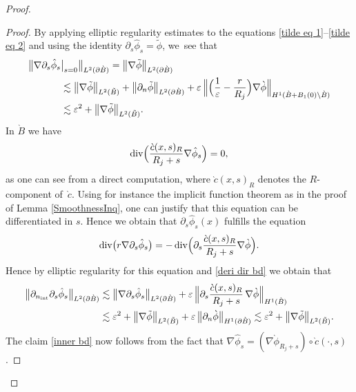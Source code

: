 \documentclass[JEP,XML,SOM,Unicode,published]{cedram}
\let\epsilon\varepsilon
\let\backslash\setminus
\theoremstyle{definition}
\renewcommand{\div}{\operatorname{div}}
\newcommand\bnorm[1]{\bigl\lVert #1\bigr\rVert}
\newcommand\Bnorm[1]{\Bigl\lVert #1\Bigr\rVert}
\newcommand\eq{=}
\let\de\partial
\let\eps\epsilon
\let\mel\relax
\begin{document}
\begin{proof}
\begin{proof}
By applying elliptic regularity estimates to the equations \eqref{tilde eq 1}--\eqref{tilde eq 2} and using the identity $\de_s\hat{\phi}_s=\tilde{\phi}$, we~see that
\begin{equation}\begin{aligned}
\bigl\|\nabla\de_s\hat{\phi}_s&\big|_{s=0}\bigr\|_{L^2(\de\grave{B})}\eq\bnorm{\nabla\tilde{\phi}}_{L^2(\de\grave{B})}\\
&\lesssim \bnorm{\nabla\tilde{\phi}}_{L^2(\tilde{B})}+\bnorm{\de_n\tilde{\phi}}_{L^2(\de\grave{B})}+\eps\,\Bnorm{\Bigl(\frac{1}{\eps}-\frac{r}{R_j}\Bigr)\nabla\grave{\phi}}_{H^1(\grave{B}+B_1(0)\backslash\grave{B})}\\
&\lesssim\eps^2+\bnorm{\nabla\tilde{\phi}}_{L^2(\tilde{B})}.\label{deri dir bd}
\end{aligned}\end{equation}
In $\grave{B}$ we have
\begin{align*}
\div\Bigl(\frac{\grave{c}(x,s)_R}{R_j+s}\nabla\hat{\phi}_s\Bigr)\eq0,
\end{align*}
as one can see from a direct computation, where $\grave{c}(x,s)_R$ denotes the $R$-component of~$\grave{c}$. Using for instance the implicit function theorem as in the proof of Lemma \ref{SmoothnessInq}, one can justify that this equation can be differentiated in $s$.
Hence we obtain that $\de_s\hat{\phi}_s(x)$ fulfills the equation
\begin{align*}
\div\bigl(r\nabla\de_s\hat{\phi}_s\bigr)\eq-\div\Bigl(\de_s\frac{\grave{c}(x,s)_R}{R_j+s}\nabla\grave{\phi}\Bigr).
\end{align*}
Hence by elliptic regularity for this equation and \eqref{deri dir bd} we obtain that
\begin{align*}
\mel\bnorm{\de_{n_\mathrm{int}}\de_s\hat{\phi}_s}_{L^2(\de\grave{B})}&\lesssim \bnorm{\nabla\de_s\hat{\phi}_s}_{L^2(\de\grave{B})}+\eps\,\Bnorm{\de_s\frac{\grave{c}(x,s)_R}{R_j+s}\,\nabla\grave{\phi}}_{H^1(\grave{B})}\\
&\lesssim \eps^2+\bnorm{\nabla\tilde{\phi}}_{L^2(\tilde{B})}+\eps\,\bnorm{\de_n\grave{\phi}}_{H^1(\de\grave{B})}\lesssim \eps^2+\bnorm{\nabla\tilde{\phi}}_{L^2(\tilde{B})}.
\end{align*}
The claim \eqref{inner bd} now follows from the fact that $\nabla\hat{\phi}_s=(\nabla\grave{\phi}_{R_j+s})\circ\grave{c}(\cdot,s)$.


\end{proof}
\end{proof}
\end{document}
